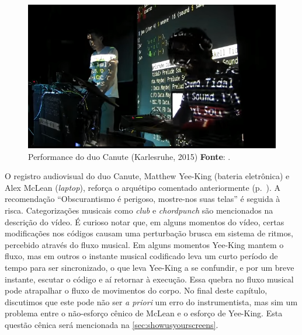 \begin{figure}[!h]
  \centering
  \includegraphics[scale=0.71]{imagens/canute.png}
  \caption{Performance do duo Canute (Karlesruhe, 2015) \textbf{Fonte}: .}
  \label{fig:canute}
\end{figure}

O registro audiovisual do duo Canute, Matthew Yee-King (bateria eletrônica) e Alex McLean (\emph{laptop}), reforça o arquétipo comentado anteriormente (p.~\pageref{fig:weaving}). A recomendação ``Obscurantismo é perigoso, mostre-nos suas telas'' é seguida à risca. Categorizações musicais como \emph{club} e \emph{chordpunch} são mencionados na descrição do vídeo. É curioso notar que, em alguns momentos do vídeo, certas modificações nos códigos causam uma perturbação brusca em sistema de ritmos, percebido através do fluxo musical. Em alguns momentos Yee-King mantem o fluxo, mas em outros o instante musical codificado leva um curto período de tempo para ser sincronizado, o que leva Yee-King a se confundir, e por um breve instante, escutar o código e aí retornar à execução. Essa quebra no fluxo musical pode atrapalhar o fluxo de movimentos do corpo. No final deste capítulo, discutimos que este pode não ser \emph{a priori} um erro do instrumentista, mas sim um problema entre o não-esforço cênico de McLean e o esforço de Yee-King. Esta questão cênica será mencionada na \autoref{sec:showusyourscreens}.

